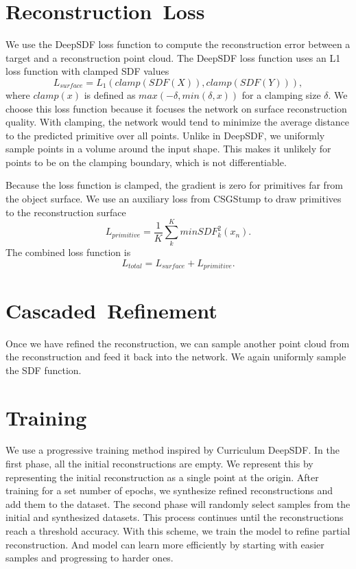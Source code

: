 \section{Reconstruction~Loss}
\label{sec:reconstruction_loss}

We use the DeepSDF loss function to compute the reconstruction error between a target and a reconstruction point cloud. The DeepSDF loss function uses an L1 loss function with clamped SDF values
\[L_{surface}=L_1(clamp(SDF(X)), clamp(SDF(Y))),\]
where $clamp(x)$ is defined as $max(-\delta, min(\delta, x))$ for a clamping size $\delta$. We choose this loss function because it focuses the network on surface reconstruction quality. With clamping, the network would tend to minimize the average distance to the predicted primitive over all points. Unlike in DeepSDF, we uniformly sample points in a volume around the input shape. This makes it unlikely for points to be on the clamping boundary, which is not differentiable.

Because the loss function is clamped, the gradient is zero for primitives far from the object surface. We use an auxiliary loss from CSGStump to draw primitives to the reconstruction surface
\[L_{primitive} = \frac{1}{K} \sum_{k}^{K} min SDF_k^2(x_n).\]
The combined loss function is
\[L_{total} = L_{surface} + L_{primitive}.\]


\section{Cascaded~Refinement}
\label{sec:cascaded_refinement}

Once we have refined the reconstruction, we can sample another point cloud from the reconstruction and feed it back into the network. We again uniformly sample the SDF function.


\section{Training}
\label{sec:training}

We use a progressive training method inspired by Curriculum DeepSDF. In the first phase, all the initial reconstructions are empty. We represent this by representing the initial reconstruction as a single point at the origin. After training for a set number of epochs, we synthesize refined reconstructions and add them to the dataset. The second phase will randomly select samples from the initial and synthesized datasets. This process continues until the reconstructions reach a threshold accuracy. With this scheme, we train the model to refine partial reconstruction. And model can learn more efficiently by starting with easier samples and progressing to harder ones.
